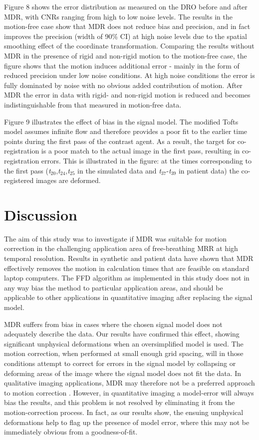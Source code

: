 \documentclass[num-refs]{wiley-article}
\begin{document}
Figure 8 shows the error distribution as measured on the DRO before and after MDR, with CNRs ranging from high to low noise levels. The results in the motion-free case show that MDR does not reduce bias and precision, and in fact improves the precision (width of 90\% CI) at high noise levels due to the spatial smoothing effect of the coordinate transformation. Comparing the results without MDR in the presence of rigid and non-rigid motion to the motion-free case, the figure shows that the motion induces additional error - mainly in the form of reduced precision under low noise conditions. At high noise conditions the error is fully dominated by noise with no obvious added contribution of motion. After MDR the error in data with rigid- and non-rigid motion is reduced and becomes indistinguishable from that measured in motion-free data.

Figure 9 illustrates the effect of bias in the signal model. The modified Tofts model assumes infinite flow and therefore provides a poor fit to the earlier time points during the first pass of the contrast agent. As a result, the target for co-registration is a poor match to the actual image in the first pass, resulting in co-registration errors. This is illustrated in the figure: at the times corresponding to the first pass ({\it t}$_{20}$,{\it t}$_{24}$,{\it t}$_{25}$ in the simulated data and {\it t}$_{37}$-{\it t}$_{39}$ in patient data) the co-registered images are deformed. 

\section{Discussion}

The aim of this study was to investigate if MDR was suitable for motion correction in the challenging application area of free-breathing MRR at high temporal resolution. Results in synthetic and patient data have shown that MDR effectively removes the motion in calculation times that are feasible on standard laptop computers. The FFD algorithm as implemented in this study does not in any way bias the method to particular application areas, and should be applicable to other applications in quantitative imaging after replacing the signal model. 

MDR suffers from bias in cases where the chosen signal model does not adequately describe the data. Our results have confirmed this effect, showing significant unphysical deformations when an oversimplified model is used. The motion correction, when performed at small enough grid spacing, will in those conditions attempt to correct for errors in the signal model by collapsing or deforming areas of the image where the signal model does not fit the data. In qualitative imaging applications, MDR may therefore not be a preferred approach to motion correction \cite{Schnabel2016}. However, in quantitative imaging a model-error will always bias the results, and this problem is not resolved by eliminating it from the motion-correction process. In fact, as our results show, the ensuing unphysical deformations help to flag up the presence of model error, where this may not be immediately obvious from a goodness-of-fit. 
\end{document}
